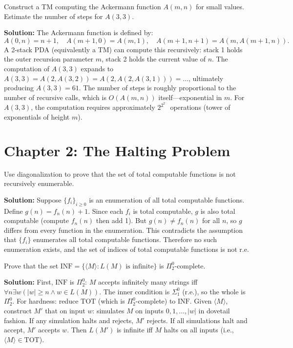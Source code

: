 \begin{exercise}[Challenge]
Construct a TM computing the Ackermann function $A(m,n)$ for small values. Estimate the number of steps for $A(3,3)$.
\end{exercise}
\textbf{Solution:} The Ackermann function is defined by:
\[
A(0,n) = n+1, \quad A(m+1,0) = A(m,1), \quad A(m+1,n+1) = A(m, A(m+1,n)).
\]
A 2-stack PDA (equivalently a TM) can compute this recursively: stack 1 holds the outer recursion parameter $m$, stack 2 holds the current value of $n$. The computation of $A(3,3)$ expands to $A(3,3) = A(2,A(3,2)) = A(2,A(2,A(3,1))) = \ldots$, ultimately producing $A(3,3) = 61$. The number of steps is roughly proportional to the number of recursive calls, which is $O(A(m,n))$ itself---exponential in $m$. For $A(3,3)$, the computation requires approximately $2^{2^{2^{\ldots}}}$ operations (tower of exponentials of height $m$).

\section{Chapter 2: The Halting Problem}

\begin{exercise}[Basic]
Use diagonalization to prove that the set of total computable functions is not recursively enumerable.
\end{exercise}
\textbf{Solution:} Suppose $\{f_i\}_{i \ge 0}$ is an enumeration of all total computable functions. Define $g(n) = f_n(n) + 1$. Since each $f_i$ is total computable, $g$ is also total computable (compute $f_n(n)$ then add 1). But $g(n) \neq f_n(n)$ for all $n$, so $g$ differs from every function in the enumeration. This contradicts the assumption that $\{f_i\}$ enumerates all total computable functions. Therefore no such enumeration exists, and the set of indices of total computable functions is not r.e.

\begin{exercise}[Intermediate]
Prove that the set $\mathrm{INF} = \{\langle M \rangle : L(M) \text{ is infinite}\}$ is $\Pi_2^0$-complete.
\end{exercise}
\textbf{Solution:} First, $\mathrm{INF}$ is $\Pi_2^0$: $M$ accepts infinitely many strings iff $\forall n \exists w (|w| \ge n \land w \in L(M))$. The inner condition is $\Sigma_1^0$ (r.e.), so the whole is $\Pi_2^0$. For hardness: reduce $\mathrm{TOT}$ (which is $\Pi_2^0$-complete) to $\mathrm{INF}$. Given $\langle M \rangle$, construct $M'$ that on input $w$: simulates $M$ on inputs $0, 1, \ldots, |w|$ in dovetail fashion. If any simulation halts and rejects, $M'$ rejects. If all simulations halt and accept, $M'$ accepts $w$. Then $L(M')$ is infinite iff $M$ halts on all inputs (i.e., $\langle M \rangle \in \mathrm{TOT}$).

